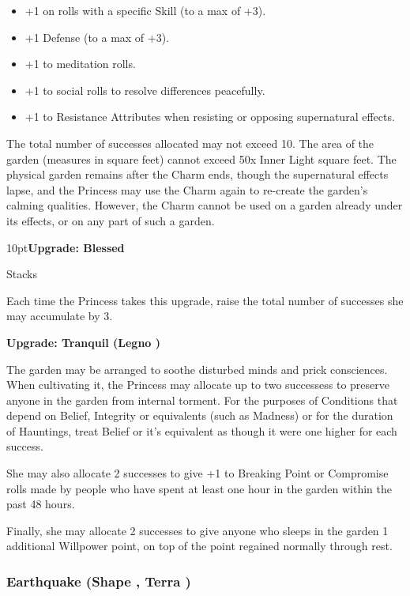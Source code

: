   \begin{itemize} \item  +1 on rolls with a specific Skill (to a max of +3).
  \item  +1 Defense (to a max of +3).
  \item  +1 to meditation rolls.
  \item  +1 to social rolls to resolve differences peacefully.
  \item  +1 to Resistance Attributes when resisting or opposing supernatural effects. \end{itemize}

The total number of successes allocated may not exceed 10. The area of the garden (measures in square feet) cannot exceed 50x Inner Light square feet. The physical garden remains after the Charm ends, though the supernatural effects lapse, and the Princess may use the Charm again to re-create the garden's calming qualities. However, the Charm cannot be used on a garden already under its effects, or on any part of such a garden.
\begin{myindentpar}{10pt}\textbf{Upgrade: Blessed}

Stacks

Each time the Princess takes this upgrade, raise the total number of successes she may accumulate by 3.

\textbf{Upgrade: Tranquil (Legno \textbullet\textbullet\textbullet\textbullet\textbullet)}

The garden may be arranged to soothe disturbed minds and prick consciences. When cultivating it, the Princess may allocate up to two successess to preserve anyone in the garden from internal torment. For the purposes of Conditions that depend on Belief, Integrity or equivalents (such as Madness) or for the duration of Hauntings, treat Belief or it's equivalent as though it were one higher for each success. 

She may also allocate 2 successes to give +1 to Breaking Point or Compromise rolls made by people who have spent at least one hour in the garden within the past 48 hours. 

Finally, she may allocate 2 successes to give anyone who sleeps in the garden 1 additional Willpower point, on top of the point regained normally through rest.\end{myindentpar}

\subsubsection*{Earthquake (Shape \textbullet\textbullet\textbullet\textbullet, Terra \textbullet\textbullet\textbullet)}

